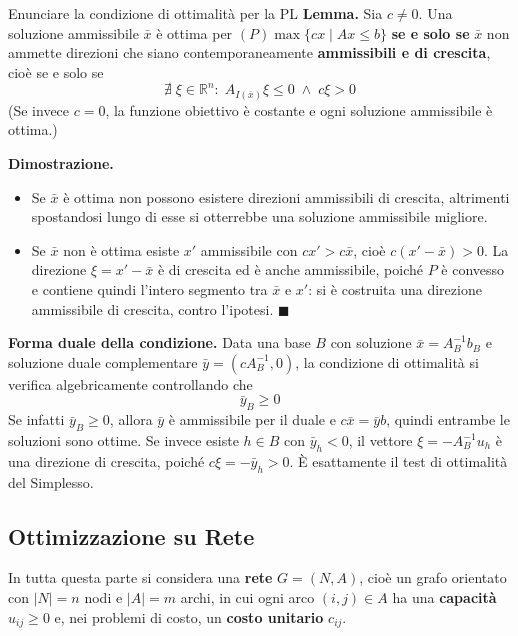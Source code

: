 \documentclass[12pt]{extarticle} %
\begin{document}
\begin{teoriabox}{Enunciare la condizione di ottimalità per la PL}
\textbf{Lemma.} Sia $c \ne 0$. Una soluzione ammissibile $\bar{x}$ è ottima per $(P) \max\{cx \mid Ax\le b\}$ \textbf{se e solo se} $\bar{x}$ non ammette direzioni che siano contemporaneamente \textbf{ammissibili e di crescita}, cioè se e solo se
\[
\nexists \; \xi \in \mathbb{R}^n : \; A_{I(\bar{x})}\xi \le 0 \; \wedge \; c\xi > 0
\]
(Se invece $c = 0$, la funzione obiettivo è costante e ogni soluzione ammissibile è ottima.)

\noindent\textbf{Dimostrazione.}
\begin{itemize}
    \item[$\implies$] Se $\bar{x}$ è ottima non possono esistere direzioni ammissibili di crescita, altrimenti spostandosi lungo di esse si otterrebbe una soluzione ammissibile migliore.
    \item[$\impliedby$] Se $\bar{x}$ non è ottima esiste $x'$ ammissibile con $cx' > c\bar{x}$, cioè $c(x'-\bar{x}) > 0$. La direzione $\xi = x'-\bar{x}$ è di crescita ed è anche ammissibile, poiché $P$ è convesso e contiene quindi l'intero segmento tra $\bar x$ e $x'$: si è costruita una direzione ammissibile di crescita, contro l'ipotesi. $\blacksquare$
\end{itemize}
\noindent\textbf{Forma duale della condizione.} Data una base $B$ con soluzione $\bar{x} = A_B^{-1}b_B$ e soluzione duale complementare $\bar{y} = (cA_B^{-1}, 0)$, la condizione di ottimalità si verifica algebricamente controllando che
\[
\bar{y}_B \ge 0
\]
Se infatti $\bar y_B \ge 0$, allora $\bar y$ è ammissibile per il duale e $c\bar x = \bar y b$, quindi entrambe le soluzioni sono ottime. Se invece esiste $h \in B$ con $\bar{y}_h < 0$, il vettore $\xi = -A_B^{-1}u_h$ è una direzione di crescita, poiché $c\xi = -\bar{y}_h > 0$. È esattamente il test di ottimalità del Simplesso.
\end{teoriabox}

\subsection{Ottimizzazione su Rete}

\noindent In tutta questa parte si considera una \textbf{rete} $G = (N,A)$, cioè un grafo orientato con $|N| = n$ nodi e $|A| = m$ archi, in cui ogni arco $(i,j) \in A$ ha una \textbf{capacità} $u_{ij} \ge 0$ e, nei problemi di costo, un \textbf{costo unitario} $c_{ij}$.
\end{document}
